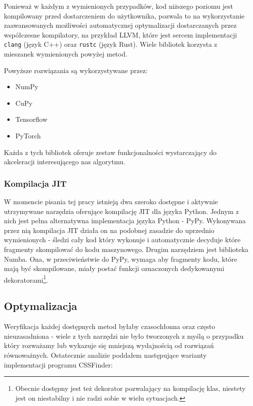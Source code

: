 \documentclass[12pt, a4paper]{article}
\newcommand{\code}[1]{\texttt{#1}}
\begin{document}
\begin{sloppypar}
    Ponieważ w każdym z wymienionych przypadków, kod niższego poziomu jest kompilowany
    przed dostarczeniem do użytkownika, pozwala to na wykorzystanie zaawansowanych możliwości
    automatycznej optymalizacji dostarczanych przez współczesne kompilatory, na przykład
    LLVM, które jest sercem implementacji \code{clang} (język C++) oraz \code{rustc} (język
    Rust). Wiele bibliotek korzysta z mieszanek wymienionych powyżej metod.

    Powyższe rozwiązania są wykorzystywane przez:
    \begin{itemize}
      \item NumPy

      \item CuPy

      \item Tensorflow

      \item PyTorch
    \end{itemize}

    Każda z tych bibliotek oferuje zestaw funkcjonalności wystarczający do akceleracji
    interesującego nas algorytmu.

    \subsubsection{Kompilacja JIT}


    W momencie pisania tej pracy istnieją dwa szeroko dostępne i aktywnie utrzymywane
    narzędzia oferujące kompilację JIT dla języka Python. Jednym z nich jest pełna alternatywna
    implementacja języka Python - PyPy\cite{PyPy_Home_Page}. Wykonywana przez nią kompilacja
    JIT działa on na podobnej zasadzie do uprzednio wymienionych - śledzi cały kod który
    wykonuje i automatycznie decyduje które fragmenty skompilować do kodu maszynowego\cite{PyPy_JIT}.
    Drugim narzędziem jest biblioteka Numba\cite{Numba_Article}\cite{Numba_Doc}. Ona, w przeciwieństwie
    do PyPy, wymaga aby fragmenty kodu, które mają być skompilowane, miały postać
    funkcji oznaczonych dedykowanymi dekoratorami\footnote{Obecnie dostępny jest też dekorator
    pozwalający na kompilację klas, niestety jest on niestabilny i nie radzi sobie w
    wielu sytuacjach.}.

    \subsection{Optymalizacja}


    Weryfikacja każdej dostępnych metod byłaby czasochłonna oraz często nieuzasadniona -
    wiele z tych narzędzi nie było tworzonych z myślą o przypadku który rozważamy lub
    wykazuje się mniejszą wydajnością od rozwiązań równoważnych. Ostatecznie analizie poddałem
    następujące warianty implementacji programu CSSFinder:


\end{sloppypar}
\end{document}
